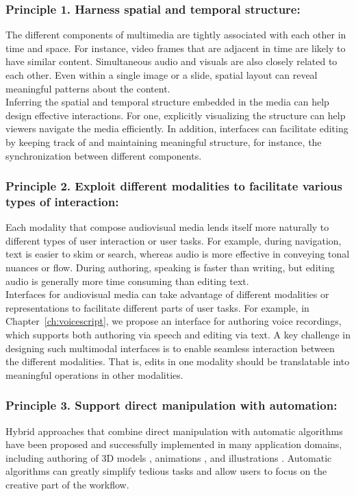 \subsubsection*{Principle 1. Harness spatial and temporal structure:}
The different components of multimedia are tightly associated with each other in time and space. For instance, video frames that are adjacent in time are likely to have similar content. Simultaneous audio and visuals are also closely related to each other. Even within a single image or a slide, spatial layout can reveal meaningful patterns about the content.\\

Inferring the spatial and temporal structure embedded in the media can help design effective interactions. For one, explicitly visualizing the structure can help viewers navigate the media efficiently. In addition, interfaces can facilitate editing by keeping track of and maintaining meaningful structure, for instance, the synchronization between different components. \\

\subsubsection*{Principle 2. Exploit different modalities to facilitate various types of interaction:}
Each modality that compose audiovisual media lends itself more naturally to different types of user interaction or user tasks. For example, during navigation, text is easier to skim or search, whereas audio is more effective in conveying tonal nuances or flow. During authoring, speaking is faster than writing, but editing audio is generally more time consuming than editing text.\\

Interfaces for audiovisual media can take advantage of different modalities or representations to facilitate different parts of user tasks. For example, in Chapter~\ref{ch:voicescript}, we propose an interface for authoring voice recordings, which supports both authoring via speech and editing via text.  A key challenge in designing such multimodal interfaces is to enable seamless interaction between the different modalities. That is, edits in one modality should be translatable into meaningful operations in other modalities.\\  

\subsubsection*{Principle 3. Support direct manipulation with automation:}
Hybrid approaches that combine direct manipulation with automatic algorithms have been proposed and successfully implemented in many application domains, including authoring of 3D models \cite{gal2009iwires, prevost2013make}, animations \cite{bai2016artist}, and illustrations \cite{chi2012mixt}. Automatic algorithms can greatly simplify tedious tasks and allow users to focus on the creative part of the workflow.\\

